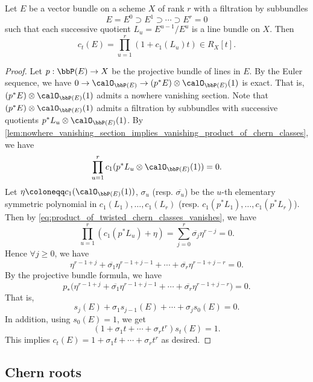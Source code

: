   \begin{proposition}\label{prop:chern_classes_of_vector_bundles_and_its_filtration_by_line_bundles}
    Let $E$ be a vector bundle on a scheme $X$ of rank $r$ with a filtration by subbundles
    \[ E = E^0 \supset E^1 \supset \cdots \supset E^r = 0 \]
    such that each successive quotient $L_u = E^{u-1} / E^u$ is a line bundle on $X$.
    Then 
    \[ c_t(E) = \prod_{u=1}^r (1 + c_1(L_u) t) \in R_X [t]. \]
  \end{proposition}
  \begin{proof}
    Let $p: \bbP(E) \to X$ be the projective bundle of lines in $E$.
    By the Euler sequence, we have $ 0 \to \calO_{\bbP(E)} \to (p^* E) \otimes \calO_{\bbP(E)}(1)$ is exact.
    That is, $(p^* E) \otimes \calO_{\bbP(E)}(1)$ admits a nowhere vanishing section.
    Note that $(p^* E) \otimes \calO_{\bbP(E)}(1)$ admits a filtration by subbundles with successive quotients $p^*L_u \otimes \calO_{\bbP(E)}(1)$.
    By \cref{lem:nowhere_vanishing_section_implies_vanishing_product_of_chern_classes}, we have 
    \begin{equation}\label{eq:product_of_twisted_chern_classes_vanishes}
      \prod_{u=1}^r c_1(p^*L_u \otimes \calO_{\bbP(E)}(1)) = 0.
    \end{equation}
    Let $\eta \coloneqq c_1(\calO_{\bbP(E)}(1))$, $\sigma_u$ (resp. $\overline{\sigma_u}$) be the $u$-th elementary symmetric polynomial in $c_1(L_1), \ldots, c_1(L_r)$ (resp. $c_1(p^*L_1), \dots, c_1(p^*L_r)$).
    Then by \cref{eq:product_of_twisted_chern_classes_vanishes}, we have
    \[ \prod_{u=1}^r (c_1(p^*L_u) + \eta) = \sum_{j=0}^r \overline{\sigma_j} \eta^{r-j} = 0. \]
    Hence $\forall j \geq 0$, we have
    \[ \eta^{r-1+j} + \overline{\sigma_1} \eta^{r-1+j-1} + \cdots + \overline{\sigma_r} \eta^{r-1+j-r} = 0. \]
    By the projective bundle formula, we have
    \[ p_*\big( \eta^{r-1+j} + \overline{\sigma_1} \eta^{r-1+j-1} + \cdots + \overline{\sigma_r} \eta^{r-1+j-r} \big) = 0. \]
    That is, 
    \[ s_j(E) + \sigma_1 s_{j-1}(E) + \cdots + \sigma_j s_0(E) = 0. \]
    In addition, using $s_0(E) = 1$, we get
    \[ (1 + \sigma_1 t + \cdots + \sigma_r t^r) s_t(E) = 1. \]
    This implies $c_t(E) = 1 + \sigma_1 t + \cdots + \sigma_r t^r$ as desired.
  \end{proof}


\subsection{Chern roots}

